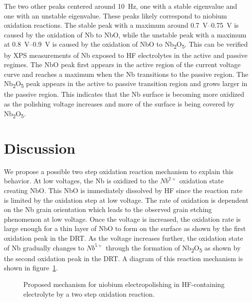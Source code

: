 The two other peaks centered around \qty{10}{\hertz}, one with a stable eigenvalue and one with an unstable eigenvalue. These peaks likely correspond to niobium oxidation reactions. The stable peak with a maximum around \qtyrange{0.7}{0.75}{\volt} is caused by the oxidation of Nb to NbO, while the unstable peak with a maximum at \qtyrange{0.8}{0.9}{\volt} is caused by the oxidation of NbO to Nb\textsubscript{2}O\textsubscript{5}. This can be verified by XPS measurements of Nb exposed to HF electrolytes in the active and passive regimes.\cite{ranjith2018anodic} The NbO peak first appears in the active region of the current voltage curve and reaches a maximum when the Nb transitions to the passive region. The Nb\textsubscript{2}O\textsubscript{5} peak appears in the active to passive transition region and grows larger in the passive region. This indicates that the Nb surface is becoming more oxidized as the polishing voltage increases and more of the surface is being covered by Nb\textsubscript{2}O\textsubscript{5}. 






\section{Discussion}

We propose a possible two step oxidation reaction mechanism to explain this behavior. At low voltages, the Nb is oxidized to the $Nb^{2+}$ oxidation state creating NbO. This NbO is immediately dissolved by HF since the reaction rate is limited by the oxidation step at low voltage. The rate of oxidation is dependent on the Nb grain orientation which leads to the observed grain etching phenomenon at low voltage. Once the voltage is increased, the oxidation rate is large enough for a thin layer of NbO to form on the surface as shown by the first oxidation peak in the DRT. As the voltage increases further, the oxidation state of Nb gradually changes to $Nb^{5+}$ through the formation of Nb\textsubscript{2}O\textsubscript{5} as shown by the second oxidation peak in the DRT. A diagram of this reaction mechanism is shown in figure~\ref{fig:diagram}.




\begin{figure}
  \centering
  
  
  \caption{Proposed mechanism for niobium electropolishing in HF-containing electrolyte by a two step oxidation reaction.}
  \label{fig:diagram}
\end{figure}



